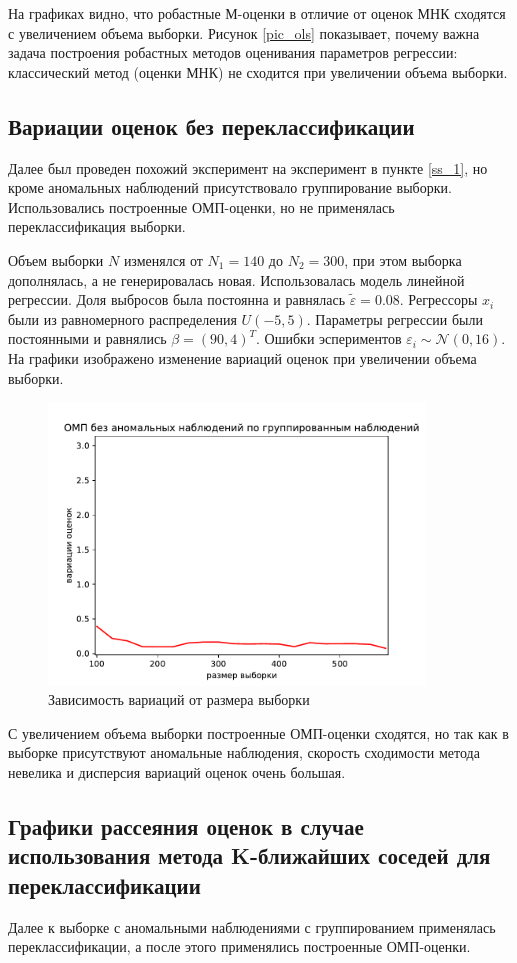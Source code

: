 На графиках видно, что робастные М-оценки в отличие от оценок МНК сходятся с увеличением объема выборки. 
Рисунок \ref{pic_ols} показывает, почему важна задача построения робастных методов оценивания параметров регрессии: классический метод (оценки МНК) не сходится при увеличении объема выборки.

\subsection{Вариации оценок без переклассификации}
Далее был проведен похожий эксперимент на эксперимент в пункте \ref{ss_1}, но кроме аномальных наблюдений присутствовало группирование выборки. Использовались построенные ОМП-оценки, но не применялась переклассификация выборки. 

Объем выборки $N$ изменялся от $N_1=140$ до $N_2=300$, при этом выборка дополнялась, а не генерировалась новая. Использовалась модель линейной регрессии. Доля выбросов была постоянна и равнялась $\widetilde{\varepsilon}=0.08$. 
Регрессоры $x_i$ были из равномерного распределения $U(-5,5)$.  Параметры регрессии были постоянными и равнялись $\beta=(90,4)^T$. Ошибки эспериментов $\varepsilon_i\sim \mathcal{N}(0,16)$.
На графики изображено изменение вариаций оценок при увеличении объема выборки.
\begin{figure}[hb]
    \centering
    \includegraphics[width=100mm]{../images/MLE_no_outliers(2).pdf}
    \caption{Зависимость вариаций от размера выборки\label{overflow}}
    \label{pic6}
\end{figure}

С увеличением объема выборки построенные ОМП-оценки сходятся, но так как в выборке присутствуют аномальные наблюдения, скорость сходимости метода невелика и дисперсия вариаций оценок очень большая. 

\subsection{Графики рассеяния оценок в случае использования метода K-ближайших соседей для переклассификации}
Далее к выборке с аномальными наблюдениями с группированием применялась переклассификации, а после этого применялись построенные ОМП-оценки.

